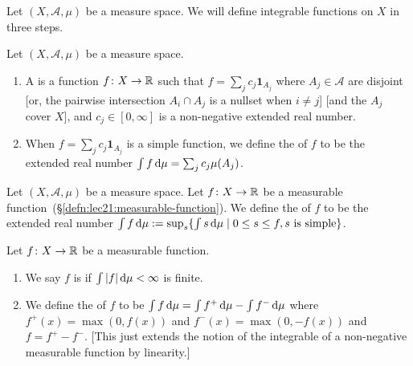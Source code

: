 

\begin{node}
Let $(X,\mathcal{A},\mu)$ be a measure space. We will define
integrable functions on $X$ in three steps.
\end{node}

\begin{definition}
Let $(X,\mathcal{A},\mu)$ be a measure space.
\begin{enumerate}
\item 
A  is a function $f\colon X\to\mathbb{R}$ such that
$f=\sum_{j} c_{j}\mathbf{1}_{A_{j}}$ where $A_{j}\in\mathcal{A}$ are
disjoint [or, the pairwise intersection $A_{i}\cap A_{j}$ is a nullset
  when $i\neq j$] [and the $A_{j}$ cover $X$], and
$c_{j}\in[0,\infty]$ is a non-negative extended real number.
\item When $f=\sum_{j}c_{j}\mathbf{1}_{A_{j}}$ is a simple function,
  we define the  of $f$ to be the extended real
  number $\int f\,\mathrm{d}\mu=\sum_{j}c_{j}\mu(A_{j})$.
\end{enumerate}
\end{definition}

\begin{definition}
Let $(X,\mathcal{A},\mu)$ be a measure space.
Let $f\colon X\to\mathbb{R}$ be a measurable function~(\S\ref{defn:lec21:measurable-function}).
We define the  of $f$ to be the extended real number
$\int f\,\mathrm{d}\mu:=\sup_{s}\{\int s\,\mathrm{d}\mu\mid 0\leq s\leq f,s\mbox{ is simple}\}$.
\end{definition}

\begin{definition}
Let $f\colon X\to\mathbb{R}$ be a measurable function.
\begin{enumerate}
\item We say $f$ is
 if $\int|f|\,\mathrm{d}\mu<\infty$ is finite.
\item We define the  of $f$ to be $\int f\,\mathrm{d}\mu=\int f^{+}\,\mathrm{d}\mu-\int f^{-}\,\mathrm{d}\mu$
  where $f^{+}(x)=\max(0,f(x))$ and $f^{-}(x)=\max(0,-f(x))$ and $f=f^{+}-f^{-}$.
  [This just extends the notion of the integrable of a non-negative
    measurable function by linearity.]
\end{enumerate}
\end{definition}

